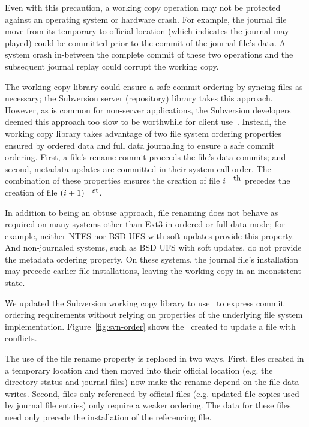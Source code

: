 Even with this precaution, a working copy operation may not be
protected against an operating system or hardware crash.
%
For example, the journal file move from its temporary to official
location (which indicates the journal may played) could be committed
prior to the commit of the journal file's data.
%
A system crash in-between the complete commit of these two operations
and the subsequent journal replay could corrupt the working copy.

The working copy library could ensure a safe commit ordering by
syncing files as necessary; the Subversion server (repository) library
takes this approach.
%
However, as is common for non-server applications, the Subversion
developers deemed this approach too slow to be worthwhile for client
use~\cite{svntradeoff}.
%
Instead, the working copy library takes advantage of two file system
ordering properties ensured by ordered data and full data journaling
to ensure a safe commit ordering.
%
First, a file's rename commit proceeds the file's data commits;
%
and second, metadata updates are committed in their system call order.
%
The combination of these properties ensures the creation of file
$i^{\mbox{\small{th}}}$ precedes the creation of file
$(i+1)^{\mbox{\small{st}}}$.

In addition to being an obtuse approach, file renaming does not behave
as required on many systems other than Ext3 in ordered or full data
mode; for example, neither NTFS nor BSD UFS with soft updates provide
this property.
%
And non-journaled systems, such as BSD UFS with soft updates, do not
provide the metadata ordering property. On these systems, the journal
file's installation may precede earlier file installations, leaving the
working copy in an inconsistent state.

We updated the Subversion working copy library to use \opgroups\ to
express commit ordering requirements without relying on properties of the
underlying file system implementation.
%
Figure~\ref{fig:svn-order} shows the \opgroups\ created to update a
file with conflicts.

The use of the file rename property is replaced in two ways.
%
First, files created in a temporary location and then moved into their
official location (e.g. the directory status and journal files) now
make the rename depend on the file data writes.
%
Second, files only referenced by official files (e.g. updated file
copies used by journal file entries) only require a weaker ordering.
The data for these files need only precede the installation of the
referencing file.

